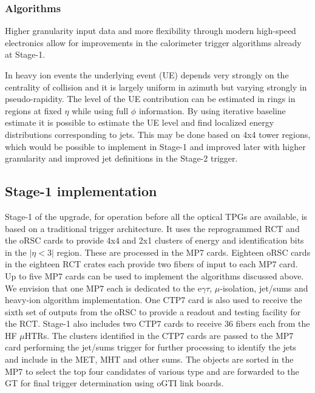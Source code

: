 \subsubsection{Algorithms\label{calo:algos}}

Higher granularity input data and more flexibility through modern high-speed electronics 
allow for improvements in the calorimeter trigger algorithms already at Stage-1.

In heavy ion events the underlying event (UE) depends very strongly on the centrality of collision and it is largely uniform in azimuth but varying strongly in pseudo-rapidity. The level of the UE contribution 
can be estimated in rings in regions at fixed $\eta$ while using full $\phi$ information. By using iterative baseline estimate
it is possible to estimate the UE level and find localized energy distributions corresponding to jets. 
This may be done based on 4x4 tower regions, 
which would be possible to implement in Stage-1 and improved later 
with higher granularity and improved jet definitions in the Stage-2 trigger.

\subsection{Stage-1 implementation\label{calo:integration}}

Stage-1 of the upgrade, for operation before all the optical TPGs are
available, is based on a traditional trigger architecture.  It uses
the reprogrammed RCT and the oRSC cards to provide 4x4 and 2x1
clusters of energy and identification bits in the $|\eta<3|$ region.
These are processed in the MP7 cards.  Eighteen oRSC cards in the
eighteen RCT crates each provide two fibers of input to each MP7 card.
Up to five MP7 cards can be used to implement the algorithms discussed
above.  We envision that one MP7 each is dedicated to the
e$\gamma\tau$, $\mu$-isolation, jet/sums and heavy-ion algorithm
implementation. One CTP7 card is also used to receive the sixth set of
outputs from the oRSC to provide a readout and testing facility for
the RCT.  Stage-1 also includes two CTP7 cards to receive 36 fibers
each from the HF $\mu$HTRs.  The clusters identified in the CTP7 cards
are passed to the MP7 card performing the jet/sums trigger for
further processing to identify the jets and include in the MET, MHT
and other sums.  The objects are sorted in the MP7 to select the
top four candidates of various type and are forwarded to the GT
for final trigger determination using oGTI link boards.

